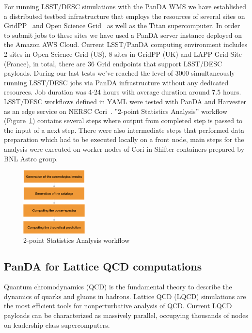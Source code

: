 \documentclass{webofc}
\begin{document}
For running LSST/DESC simulations with the PanDA WMS we have established a distributed testbed infrastructure that employs the resources of several sites on GridPP~\cite{GridPP_Collaboration_2005} and Open Science Grid~\cite{Pordes_2007} as well as the Titan supercomputer. In order to submit jobs to these sites we have used a PanDA server instance deployed on the Amazon AWS Cloud. 
Current LSST/PanDA computing environment includes 2 sites in Open Science Grid (US), 8 sites in GridPP (UK) and LAPP Grid Site (France), in total, there are 36 Grid endpoints that support LSST/DESC payloads. During our last tests we've reached the level of 3000 simultaneously running LSST/DESC jobs via PanDA infrastructure without any dedicated resources. 
Job duration was 4-24 hours with average duration around 7.5 hours.
LSST/DESC workflows defined in YAML were tested with PanDA and Harvester as an edge service on NERSC Cori~\cite{NERSC_Cori}. ''2-point Statistics Analysis'' workflow (Figure~\ref{fig:lsst_desc_2pt_stats}) contains several steps where output from completed step is passed to the input of a next step. There were also intermediate steps that performed data preparation which had to be executed locally on a front node, main steps for the analysis were executed on worker nodes of Cori in Shifter containers prepared by BNL Astro group.



\begin{figure}
  \centering
  \includegraphics[width=0.30\textwidth]{figures/LSST_2point_statistics.png}
  \caption{2-point Statistics Analysis workflow}
  \label{fig:lsst_desc_2pt_stats}
\end{figure}


\subsection{PanDA for Lattice QCD computations} \label{section_lqcd}

Quantum chromodynamics (QCD) is the fundamental theory to describe the dynamics of quarks and gluons in hadrons.
Lattice QCD (LQCD) simulations are the most efficient tools for nonperturbative analysis of QCD.
Current LQCD payloads can be characterized as massively parallel, occupying thousands of nodes on leadership-class supercomputers. 
\end{document}
